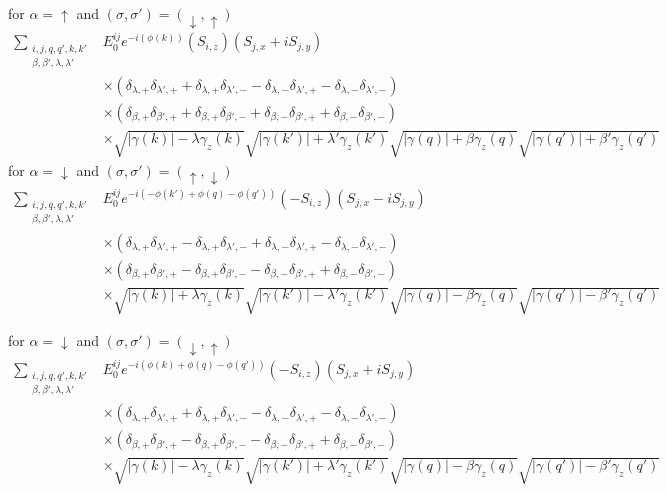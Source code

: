 for $\alpha = \uparrow$ and $(\sigma, \sigma') =(\downarrow, \uparrow)$
\begin{align} 
    \sum_{\substack{i, j, q,q', k, k'\\ \beta, \beta', \lambda, \lambda' }} &E^{ij}_0 e^{-i(\phi(k))} \left( S_{i,z}\right) \left( S_{j,x}+ iS_{j,y} \right)\\ \nonumber
   &\times \left( \delta_{\lambda,+}\delta_{\lambda',+} + \delta_{\lambda,+}\delta_{\lambda',-} -\delta_{\lambda,-}\delta_{\lambda',+}- \delta_{\lambda,-}\delta_{\lambda',-}\right)\\\nonumber
   &\times \left( \delta_{\beta,+}\delta_{\beta',+} + \delta_{\beta,+}\delta_{\beta',-}+ \delta_{\beta,-}\delta_{\beta',+}+ \delta_{\beta,-}\delta_{\beta',-}\right)\\\nonumber
   &\times \sqrt{|\gamma(k)|- \lambda \gamma_z(k)}\sqrt{|\gamma(k')|+ \lambda'\gamma_z(k')}\sqrt{|\gamma(q)|+\beta \gamma_z(q)}\sqrt{|\gamma(q')|+ \beta'\gamma_z(q')}
\end{align}
for $\alpha = \downarrow$ and $(\sigma, \sigma') =(\uparrow, \downarrow)$
\begin{align}
    \sum_{\substack{i, j, q,q', k, k'\\ \beta, \beta', \lambda, \lambda'}} & E^{ij}_0 e^{-i(-\phi(k')+\phi(q)-\phi(q'))}  \left( -S_{i,z}\right) \left( S_{j,x}-iS_{j,y}\right)\\ \nonumber
   &\times \left( \delta_{\lambda,+}\delta_{\lambda',+} - \delta_{\lambda,+}\delta_{\lambda',-}+ \delta_{\lambda,-}\delta_{\lambda',+}-\delta_{\lambda,-}\delta_{\lambda',-}\right)\\\nonumber
   &\times \left( \delta_{\beta,+}\delta_{\beta',+} - \delta_{\beta,+}\delta_{\beta',-}- \delta_{\beta,-}\delta_{\beta',+}+\delta_{\beta,-}\delta_{\beta',-}\right)\\\nonumber
   &\times \sqrt{|\gamma(k)|+ \lambda\gamma_z(k)}\sqrt{|\gamma(k')|- \lambda'\gamma_z(k')}\sqrt{|\gamma(q)|- \beta\gamma_z(q)}\sqrt{|\gamma(q')|- \beta'\gamma_z(q')}
\end{align}

for $\alpha = \downarrow$ and $(\sigma, \sigma') =(\downarrow, \uparrow)$
\begin{align} 
    \sum_{\substack{i, j, q,q', k, k'\\ \beta, \beta', \lambda, \lambda' }} &E^{ij}_0 e^{-i(\phi(k)+\phi(q)-\phi(q'))}  \left( -S_{i,z}\right) \left( S_{j,x}+ iS_{j,y} \right)\\ \nonumber
   &\times \left( \delta_{\lambda,+}\delta_{\lambda',+} + \delta_{\lambda,+}\delta_{\lambda',-} -\delta_{\lambda,-}\delta_{\lambda',+}- \delta_{\lambda,-}\delta_{\lambda',-}\right)\\\nonumber
   &\times \left( \delta_{\beta,+}\delta_{\beta',+} - \delta_{\beta,+}\delta_{\beta',-}- \delta_{\beta,-}\delta_{\beta',+}+ \delta_{\beta,-}\delta_{\beta',-}\right)\\\nonumber
   &\times \sqrt{|\gamma(k)|- \lambda \gamma_z(k)}\sqrt{|\gamma(k')|+ \lambda'\gamma_z(k')}\sqrt{|\gamma(q)|-\beta \gamma_z(q)}\sqrt{|\gamma(q')|- \beta'\gamma_z(q')}
\end{align}

